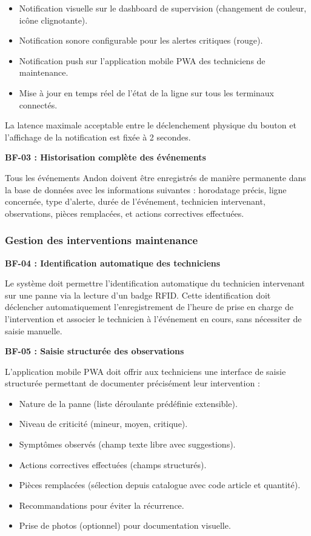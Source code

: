 \begin{itemize}
    \item Notification visuelle sur le dashboard de supervision (changement de couleur, icône clignotante).
    \item Notification sonore configurable pour les alertes critiques (rouge).
    \item Notification push sur l'application mobile PWA des techniciens de maintenance.
    \item Mise à jour en temps réel de l'état de la ligne sur tous les terminaux connectés.
\end{itemize}

La latence maximale acceptable entre le déclenchement physique du bouton et l'affichage de la notification est fixée à 2 secondes.

\textbf{BF-03 : Historisation complète des événements}

Tous les événements Andon doivent être enregistrés de manière permanente dans la base de données avec les informations suivantes : horodatage précis, ligne concernée, type d'alerte, durée de l'événement, technicien intervenant, observations, pièces remplacées, et actions correctives effectuées.


\subsubsection{Gestion des interventions maintenance}

\textbf{BF-04 : Identification automatique des techniciens}

Le système doit permettre l'identification automatique du technicien intervenant sur une panne via la lecture d'un badge RFID. Cette identification doit déclencher automatiquement l'enregistrement de l'heure de prise en charge de l'intervention et associer le technicien à l'événement en cours, sans nécessiter de saisie manuelle.

\textbf{BF-05 : Saisie structurée des observations}

L'application mobile PWA doit offrir aux techniciens une interface de saisie structurée permettant de documenter précisément leur intervention :

\begin{itemize}
    \item Nature de la panne (liste déroulante prédéfinie extensible).
    \item Niveau de criticité (mineur, moyen, critique).
    \item Symptômes observés (champ texte libre avec suggestions).
    \item Actions correctives effectuées (champs structurés).
    \item Pièces remplacées (sélection depuis catalogue avec code article et quantité).
    \item Recommandations pour éviter la récurrence.
    \item Prise de photos (optionnel) pour documentation visuelle.
\end{itemize}


